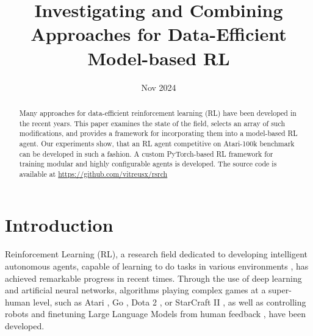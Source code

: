 \documentclass[en]{pracamgr}
\begin{document}

\title{Investigating and Combining Approaches for Data-Efficient Model-based RL}



\date{Nov 2024}




\maketitle

\begin{abstract}
  Many approaches for data-efficient reinforcement learning (RL) have been developed in the recent years. This paper examines the state of the field, selects an array of such modifications, and provides a framework for incorporating them into a model-based RL agent. Our experiments show, that an RL agent competitive on Atari-100k benchmark can be developed in such a fashion. A custom PyTorch-based RL framework for training modular and highly configurable agents is developed. The source code is available at \url{https://github.com/vitreusx/rsrch}
\end{abstract}

\tableofcontents

\chapter{Introduction}

Reinforcement Learning (RL), a research field dedicated to developing intelligent autonomous agents, capable of learning to do tasks in various environments \autocite{sutton2018reinforcement}, has achieved remarkable progress in recent times. Through the use of deep learning and artificial neural networks, algorithms playing complex games at a super-human level, such as Atari \autocite{mnihHumanlevelControlDeep2015}, Go \autocite{silverMasteringGameGo2016}, Dota 2 \autocite{openaiDota2Large2019}, or StarCraft II \autocite{vinyalsGrandmasterLevelStarCraft2019}, as well as controlling robots \autocite{openaiSolvingRubiksCube2019,brohanRT1RoboticsTransformer2023} and finetuning Large Language Models from human feedback \autocite{ouyangTrainingLanguageModels2022}, have been developed.
\end{document}
